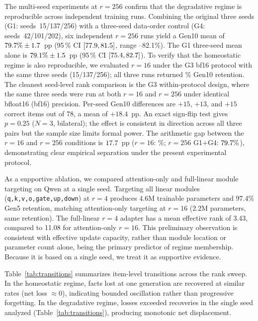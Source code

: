\documentclass[a4paper,fleqn]{cas-dc}
\newif\ifshowchanges
\newcommand{\rev}[1]{\ifshowchanges{\color{blue}#1}\else{#1}\fi}
\begin{document}
The multi-seed experiments at $r=256$ confirm that the degradative regime is
reproducible across independent training runs.
\rev{Combining the original three seeds (G1: seeds~15/137/256) with a three-seed
data-order control (G4: seeds~42/101/202), six independent $r=256$ runs
yield a Gen10 mean of $79.7\%\pm1.7$~pp
(95\,\% CI $[77.9, 81.5]$, range \GoneSeedFifteenTen--82.1\%).
The G1 three-seed mean alone is $79.1\%\pm1.5$~pp
(95\,\% CI $[75.4, 82.7]$).}
To verify that the homeostatic regime is also reproducible, we evaluated $r=16$
under the G3 bf16 protocol with the same three seeds (15/137/256); all three runs
returned \RsixteenMten\% Gen10 retention.
\rev{The cleanest seed-level rank comparison is the G3 within-protocol design,
where the same three seeds were run at both $r=16$ and $r=256$ under identical
\rev{bfloat16 (bf16)} precision. Per-seed Gen10 differences are $+15$, $+13$, and $+15$ correct
items out of 78, a mean of $+18.4$~pp. An exact sign-flip test gives $p=0.25$
($N=3$, bilateral); the effect is consistent in direction across all three pairs
but the sample size limits formal power.}
The arithmetic gap between the $r=16$ and $r=256$ conditions is
$17.7$~pp ($r=16$: \RsixteenMten\%; $r=256$ G1$+$G4: $79.7\%$),
demonstrating clear empirical separation under the present experimental protocol.

As a supportive ablation, we compared attention-only and full-linear module
targeting on Qwen at a single seed. Targeting all linear modules
(\texttt{q,k,v,o,gate,up,down}) at $r=4$ produces 4.6M trainable parameters and
97.4\% Gen5 retention, matching attention-only targeting at $r=16$ (2.2M
parameters, same retention). The full-linear $r=4$ adapter has a mean effective
rank of 3.43, compared to 11.08 for attention-only $r=16$. This preliminary
observation is consistent with effective update capacity, rather than module
location or parameter count alone, being the primary predictor of regime
membership. Because it is based on a single seed, we treat it as supportive
evidence.

Table~\ref{tab:transitions} summarizes item-level transitions across the rank
sweep. In the homeostatic regime, facts lost at one generation are recovered at
similar rates (net loss $\approx 0$), indicating bounded oscillation rather than
progressive forgetting. In the degradative regime, \rev{losses exceeded recoveries in the single seed analyzed (Table~\ref{tab:transitions}), producing monotonic net displacement.}
\end{document}
